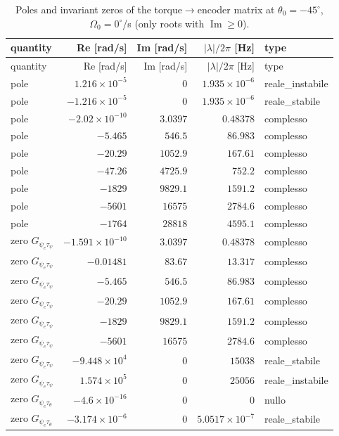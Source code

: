 \documentclass[10pt,a4paper]{article}
\numberwithin{equation}{section}
\begin{document}
\begin{longtable}{lrrrl}
\caption{Poles and invariant zeros of the torque$\to$encoder matrix at $\theta_0 = -45^\circ$, $\Omega_0 = 0^\circ$/s (only roots with $\operatorname{Im} \ge 0$).}\label{tab:polezero}\\
\toprule quantity & Re [rad/s] & Im [rad/s] & $|\lambda|/2\pi$ [Hz] & type \\ \midrule\endfirsthead
\toprule quantity & Re [rad/s] & Im [rad/s] & $|\lambda|/2\pi$ [Hz] & type \\ \midrule\endhead
pole & $1.216\times10^{-5}$ & $0$ & $1.935\times10^{-6}$ & reale\_instabile \\
pole & $-1.216\times10^{-5}$ & $0$ & $1.935\times10^{-6}$ & reale\_stabile \\
pole & $-2.02\times10^{-10}$ & $3.0397$ & $0.48378$ & complesso \\
pole & $-5.465$ & $546.5$ & $86.983$ & complesso \\
pole & $-20.29$ & $1052.9$ & $167.61$ & complesso \\
pole & $-47.26$ & $4725.9$ & $752.2$ & complesso \\
pole & $-1829$ & $9829.1$ & $1591.2$ & complesso \\
pole & $-5601$ & $16575$ & $2784.6$ & complesso \\
pole & $-1764$ & $28818$ & $4595.1$ & complesso \\
\midrule
zero $G_{\psi_e\tau_\psi}$ & $-1.591\times10^{-10}$ & $3.0397$ & $0.48378$ & complesso \\
zero $G_{\psi_e\tau_\psi}$ & $-0.01481$ & $83.67$ & $13.317$ & complesso \\
zero $G_{\psi_e\tau_\psi}$ & $-5.465$ & $546.5$ & $86.983$ & complesso \\
zero $G_{\psi_e\tau_\psi}$ & $-20.29$ & $1052.9$ & $167.61$ & complesso \\
zero $G_{\psi_e\tau_\psi}$ & $-1829$ & $9829.1$ & $1591.2$ & complesso \\
zero $G_{\psi_e\tau_\psi}$ & $-5601$ & $16575$ & $2784.6$ & complesso \\
zero $G_{\psi_e\tau_\psi}$ & $-9.448\times10^{4}$ & $0$ & $15038$ & reale\_stabile \\
zero $G_{\psi_e\tau_\psi}$ & $1.574\times10^{5}$ & $0$ & $25056$ & reale\_instabile \\
\midrule
zero $G_{\psi_e\tau_\theta}$ & $-4.6\times10^{-16}$ & $0$ & $0$ & nullo \\
zero $G_{\psi_e\tau_\theta}$ & $-3.174\times10^{-6}$ & $0$ & $5.0517\times10^{-7}$ & reale\_stabile \\

\end{longtable}
\end{document}
